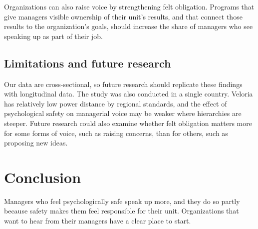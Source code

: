 \documentclass[12pt]{article}
\begin{document}
Organizations can also raise voice by strengthening felt obligation. Programs that give managers visible ownership of their unit's results, and that connect those results to the organization's goals, should increase the share of managers who see speaking up as part of their job.

\subsection{Limitations and future research}

Our data are cross-sectional, so future research should replicate these findings with longitudinal data. The study was also conducted in a single country. Veloria has relatively low power distance by regional standards, and the effect of psychological safety on managerial voice may be weaker where hierarchies are steeper. Future research could also examine whether felt obligation matters more for some forms of voice, such as raising concerns, than for others, such as proposing new ideas.

\section{Conclusion}

Managers who feel psychologically safe speak up more, and they do so partly because safety makes them feel responsible for their unit. Organizations that want to hear from their managers have a clear place to start.
\end{document}

